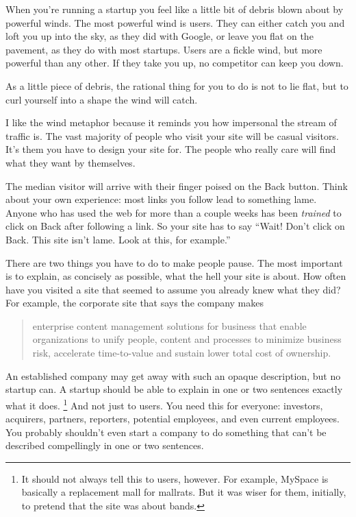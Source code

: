 \documentclass[12pt]{book}
\begin{document}
When you're running a startup you feel like a little bit of debris blown
about by powerful winds. The most powerful wind is users. They can
either catch you and loft you up into the sky, as they did with Google,
or leave you flat on the pavement, as they do with most startups. Users
are a fickle wind, but more powerful than any other. If they take you
up, no competitor can keep you down.

As a little piece of debris, the rational thing for you to do is not to
lie flat, but to curl yourself into a shape the wind will catch.

I like the wind metaphor because it reminds you how impersonal the
stream of traffic is. The vast majority of people who visit your site
will be casual visitors. It's them you have to design your site for. The
people who really care will find what they want by themselves.

The median visitor will arrive with their finger poised on the Back
button. Think about your own experience: most links you follow lead to
something lame. Anyone who has used the web for more than a couple weeks
has been \emph{trained} to click on Back after following a link. So your
site has to say ``Wait! Don't click on Back. This site isn't lame. Look
at this, for example.''

There are two things you have to do to make people pause. The most
important is to explain, as concisely as possible, what the hell your
site is about. How often have you visited a site that seemed to assume
you already knew what they did? For example, the corporate site that
says the company makes

\begin{quote}
enterprise content management solutions for business that enable
organizations to unify people, content and processes to minimize
business risk, accelerate time-to-value and sustain lower total cost of
ownership.
\end{quote}

An established company may get away with such an opaque description, but
no startup can. A startup should be able to explain in one or two
sentences exactly what it does. \footnote{It should not always tell this to users, however. For example,
MySpace is basically a replacement mall for mallrats. But it was wiser
for them, initially, to pretend that the site was about bands.} And not just to
users. You need this for everyone: investors, acquirers, partners,
reporters, potential employees, and even current employees. You probably
shouldn't even start a company to do something that can't be described
compellingly in one or two sentences.
\end{document}
